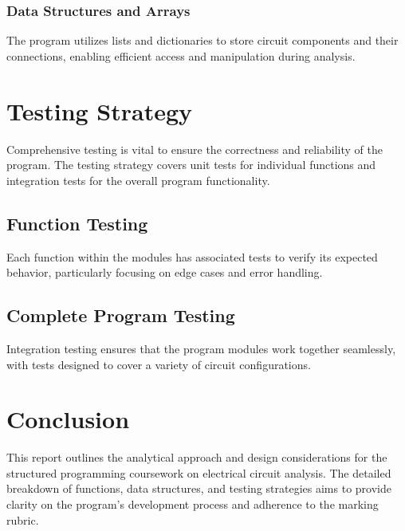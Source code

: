 \documentclass{article}
\begin{document}
\subsubsection{Data Structures and Arrays}
The program utilizes lists and dictionaries to store circuit components and their connections, enabling efficient access and manipulation during analysis.

\section{Testing Strategy}
Comprehensive testing is vital to ensure the correctness and reliability of the program. 
The testing strategy covers unit tests for individual functions and integration tests for the overall program functionality.

\subsection{Function Testing}
Each function within the modules has associated tests to verify its expected behavior, particularly focusing on edge cases and error handling.

\subsection{Complete Program Testing}
Integration testing ensures that the program modules work together seamlessly, with tests designed to cover a variety of circuit configurations.

\section{Conclusion}
This report outlines the analytical approach and design considerations for the structured programming coursework on electrical circuit analysis.
 The detailed breakdown of functions, data structures, and testing strategies aims to provide clarity on the program's development process and adherence to the marking rubric.
\end{document}
